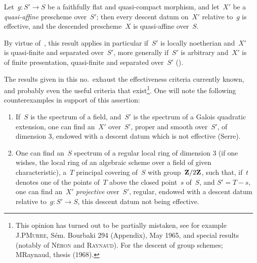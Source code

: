 \begin{corollary}
\label{VIII.7.9}
Let~$g\colon S'\to S$ be a faithfully flat and
quasi-compact morphism, and let~$X'$ be a \emph{quasi-affine}
prescheme over~$S'$; then every descent datum on~$X'$
relative to~$g$ is effective, and the descended
prescheme~$X$ is quasi-affine over~$S$.
\end{corollary}

By virtue of~, this result applies in particular
if~$S'$ is locally noetherian and~$X'$ is quasi-finite and
separated over~$S'$, more generally if~$S'$ is
arbitrary and~$X'$ is of finite presentation, quasi-finite and
separated over~$S'$ (\cf {}).

\begin{remarks}
\label{VIII.7.10}
The results given in this no.\ exhaust the effectiveness
criteria currently known, and probably
even the useful criteria that exist\footnote{This opinion
has turned out to be partially mistaken, see for example J.P\ptbl \textsc{Murre},
S\'em. Bourbaki 294 (Appendix), May 1965, and special
results (notably of \textsc{N\'eron} and \textsc{Raynaud}). For the descent of
group schemes; \cf M\ptbl Raynaud, thesis (1968).}. One will note
the following counterexamples in support of this assertion:
\begin{enumerate}
\item[(i)]
If~$S$ is the spectrum of a field, and~$S'$ is the spectrum of a
Galois quadratic extension, one can find an~$X'$ over~$S'$,
proper and smooth over~$S'$, of dimension 3, endowed with a
descent datum which is not effective (Serre).
\item[(ii)] One can find an~$S$ spectrum of a regular local ring
of dimension 3 (if one wishes, the local ring of an
algebraic scheme over a field of given
characteristic), a~$T$ principal covering of~$S$ with
group~$\mathbf{Z}/2\mathbf{Z}$, such that, if~$t$ denotes one of the points of~$T$
above the closed point~$s$ of~$S$, and $S'=T-s$, one can
find an~$X'$ \emph{projective} over~$S'$, regular, endowed with a
descent datum relative to~$g\colon S'\to S$, this
descent datum not being effective.
\end{enumerate}


\end{remarks}
